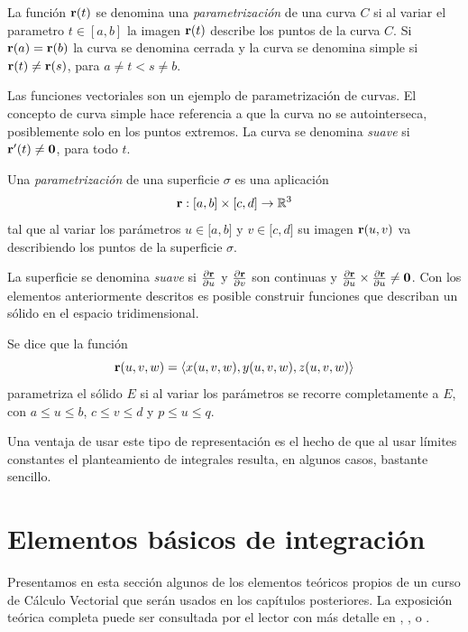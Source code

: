   \begin{tcolorbox}[title=\bf Curva parametrizada]
    La funci\'on $\mathbf{r}(t)$ se denomina una \emph{parametrizaci\'on} de una curva $C$ si
    al variar el parametro $t\in [a,b]$ la imagen $\mathbf{r}(t)$ describe los puntos de la curva $C$.
    Si $\mathbf{r}(a)=\mathbf{r}(b)$ la curva se denomina cerrada y la curva se denomina simple si $\mathbf{r}(t)\neq \mathbf{r}(s)$,
    para $a\neq t<s\neq b$.
  \end{tcolorbox}

  Las funciones vectoriales son un ejemplo de parametrización de curvas.
  El concepto de curva simple hace referencia a que la curva no se autointerseca, posiblemente solo en los puntos extremos.
  La curva se denomina \emph{suave} si $\mathbf{r}^\prime(t) \neq \mathbf{0}$, para todo $t$. 

  \begin{tcolorbox}[title=\bf Superficie parametrizada]
    Una \emph{parametrización} de una superficie $\sigma $
  es una aplicación \[\mathbf{r}:[a,b]\times \lbrack c,d]\rightarrow \mathbb{R}^{3}\]
tal que al variar los parámetros $u\in \lbrack a,b]$ y $v\in \lbrack c,d]$
su imagen $\mathbf{r}(u,v)$ va describiendo los puntos de la superficie $\sigma $.
\end{tcolorbox}
La superficie se denomina \emph{suave} si $\frac{\partial \mathbf{r}}{\partial u}$ y
$\frac{\partial \mathbf{r}}{\partial v} $ son continuas y
$\frac{\partial \mathbf{r}}{\partial u} \times \frac{\partial \mathbf{r}}{\partial u} \neq \mathbf{0}$.
%
Con los elementos anteriormente descritos es posible construir funciones
que describan un sólido en el espacio tridimensional.
\begin{tcolorbox}[title=\bf Parametrización de un sólido]
Se dice que la función \[{\bf r}(u,v,w)= \langle x(u,v,w), y(u,v,w),z(u,v,w) \rangle \]
parametriza el sólido $E$ si al variar los parámetros se recorre completamente a $E$,
con $a \leq u \leq b$, $c \leq v \leq d$ y $p \leq u \leq q$.
\end{tcolorbox}

Una ventaja de usar este tipo de representación es el hecho de que al usar límites constantes el planteamiento de integrales
resulta, en algunos casos, bastante sencillo.

\section{Elementos básicos de integración}

Presentamos en esta sección algunos de los elementos teóricos propios de un curso de
Cálculo Vectorial que serán usados en los capítulos posteriores. La exposición teórica completa puede ser consultada
por el lector con más detalle en \cite{apostol_alisis_1981}, \cite{marsden_calculo_2013}, \cite{stewart_calculo_2018} o \cite{thomas_calculo_2015}.

